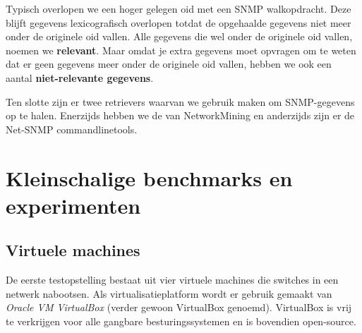 Typisch overlopen we een hoger gelegen \gls{oid} met een SNMP walkopdracht.
Deze blijft gegevens lexicografisch overlopen totdat de opgehaalde gegevens niet meer onder de originele \gls{oid} vallen.
Alle gegevens die wel onder de originele \gls{oid} vallen, noemen we \textbf{relevant}.
Maar omdat je extra gegevens moet opvragen om te weten dat er geen gegevens meer onder de originele \gls{oid} vallen,
hebben we ook een aantal \textbf{niet-relevante gegevens}.

Ten slotte zijn er twee retrievers waarvan we gebruik maken om SNMP-gegevens op te halen.
Enerzijds hebben we de \textbf{\nwmretriever{}} van NetworkMining en anderzijds zijn er de Net-SNMP commandlinetools.

\section{Kleinschalige benchmarks en experimenten}


\subsection{Virtuele machines}
\label{virtualbox}



De eerste testopstelling bestaat uit vier virtuele machines die switches in een netwerk nabootsen.
Als virtualisatieplatform wordt er gebruik gemaakt van \textit{Oracle VM VirtualBox} (verder gewoon VirtualBox genoemd).
VirtualBox is vrij te verkrijgen voor alle gangbare besturingssystemen en is bovendien open-source.

